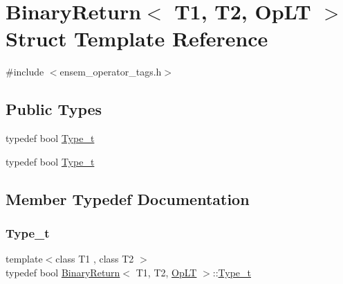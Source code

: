 \hypertarget{structBinaryReturn_3_01T1_00_01T2_00_01OpLT_01_4}{}\section{Binary\+Return$<$ T1, T2, Op\+LT $>$ Struct Template Reference}
\label{structBinaryReturn_3_01T1_00_01T2_00_01OpLT_01_4}


{\ttfamily \#include $<$ensem\+\_\+operator\+\_\+tags.\+h$>$}

\subsection*{Public Types}
\begin{DoxyCompactItemize}
\item 
typedef bool \mbox{\hyperlink{structBinaryReturn_3_01T1_00_01T2_00_01OpLT_01_4_a81d2cdfa9ce7378eebb7619141857f6d}{Type\+\_\+t}}
\item 
typedef bool \mbox{\hyperlink{structBinaryReturn_3_01T1_00_01T2_00_01OpLT_01_4_a81d2cdfa9ce7378eebb7619141857f6d}{Type\+\_\+t}}
\end{DoxyCompactItemize}


\subsection{Member Typedef Documentation}
\mbox{\label{structBinaryReturn_3_01T1_00_01T2_00_01OpLT_01_4_a81d2cdfa9ce7378eebb7619141857f6d}} 
\subsubsection{\texorpdfstring{Type\_t}{Type\_t}\hspace{0.1cm}{\footnotesize\ttfamily [1/2]}}
{\footnotesize\ttfamily template$<$class T1 , class T2 $>$ \\
typedef bool \mbox{\hyperlink{structBinaryReturn}{Binary\+Return}}$<$ T1, T2, \mbox{\hyperlink{structOpLT}{Op\+LT}} $>$\+::\mbox{\hyperlink{structBinaryReturn_3_01T1_00_01T2_00_01OpLT_01_4_a81d2cdfa9ce7378eebb7619141857f6d}{Type\+\_\+t}}}

\mbox{\label{structBinaryReturn_3_01T1_00_01T2_00_01OpLT_01_4_a81d2cdfa9ce7378eebb7619141857f6d}} 
